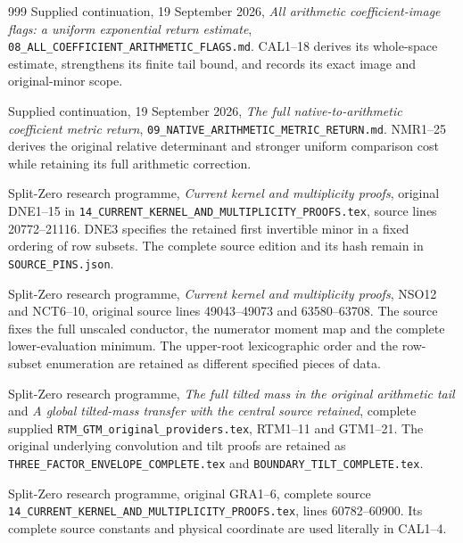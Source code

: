 \begin{thebibliography}{999}
Supplied continuation, 19 September 2026,
\emph{All arithmetic coefficient-image flags: a uniform exponential
return estimate}, \texttt{08\_ALL\_COEFFICIENT\_ARITHMETIC\_FLAGS.md}.
CAL1--18 derives its whole-space estimate, strengthens its finite
tail bound, and records its exact image and original-minor scope.

Supplied continuation, 19 September 2026,
\emph{The full native-to-arithmetic coefficient metric return},
\texttt{09\_NATIVE\_ARITHMETIC\_METRIC\_RETURN.md}.
NMR1--25 derives the original relative determinant and stronger
uniform comparison cost while retaining its full arithmetic correction.

Split-Zero research programme, \emph{Current kernel and multiplicity
proofs}, original DNE1--15 in
\texttt{14\_CURRENT\_KERNEL\_AND\_MULTIPLICITY\_PROOFS.tex},
source lines 20772--21116. DNE3 specifies the retained first
invertible minor in a fixed ordering of row subsets. The complete
source edition and its hash remain in \texttt{SOURCE\_PINS.json}.

Split-Zero research programme, \emph{Current kernel and multiplicity
proofs}, NSO12 and NCT6--10, original source lines 49043--49073
and 63580--63708. The source fixes the full unscaled conductor,
the numerator moment map and the complete lower-evaluation minimum.
The upper-root lexicographic order and the row-subset enumeration
are retained as different specified pieces of data.

Split-Zero research programme, \emph{The full tilted mass in the
original arithmetic tail} and \emph{A global tilted-mass transfer
with the central source retained}, complete supplied
\texttt{RTM\_GTM\_original\_providers.tex}, RTM1--11 and GTM1--21.
The original underlying convolution and tilt proofs are retained
as \texttt{THREE\_FACTOR\_ENVELOPE\_COMPLETE.tex} and
\texttt{BOUNDARY\_TILT\_COMPLETE.tex}.

Split-Zero research programme, original GRA1--6, complete source
\texttt{14\_CURRENT\_KERNEL\_AND\_MULTIPLICITY\_PROOFS.tex},
lines 60782--60900. Its complete source constants and physical
coordinate are used literally in CAL1--4.


\end{thebibliography}
